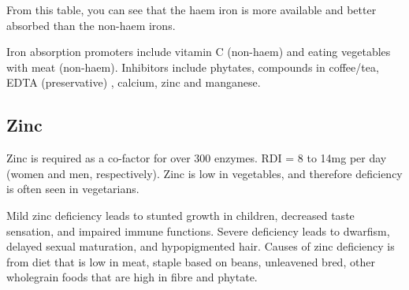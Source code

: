 From this table, you can see that the haem iron is more available and better absorbed than the non-haem irons.

Iron absorption promoters include vitamin C (non-haem) and eating vegetables with meat (non-haem).
Inhibitors include phytates, compounds in coffee/tea, EDTA (preservative) , calcium, zinc and manganese.

\subsection{Zinc}

Zinc is required as a co-factor for over 300 enzymes.
RDI = 8 to 14mg per day (women and men, respectively).
Zinc is low in vegetables, and therefore deficiency is often seen in vegetarians.

Mild zinc deficiency leads to stunted growth in children, decreased taste sensation, and impaired immune functions.
Severe deficiency leads to dwarfism, delayed sexual maturation, and hypopigmented hair.
Causes of zinc deficiency is from diet that is low in meat, staple based on beans, unleavened bred, other wholegrain foods that are high in fibre and phytate.

